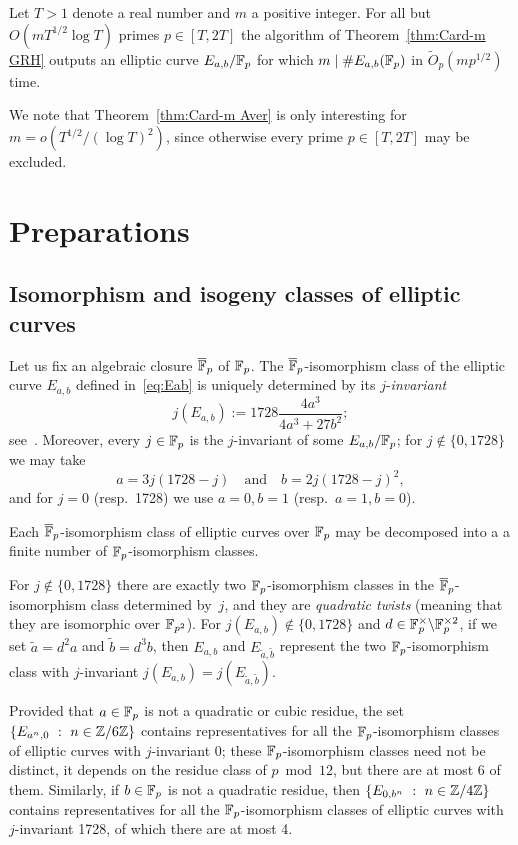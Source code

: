 \documentclass[12pt]{amsart}
\begin{document}
\begin{theorem}\label{thm:Card-m Aver}
Let $T>1$ denote a real number and $m$ a positive integer.
For all but $O(m T^{1/2}\log T)$ primes $p \in [T,2T]$ the algorithm of Theorem~\ref{thm:Card-m GRH} outputs an elliptic curve $E_{a,b}/\mathbb{F}_p$ for which $m\mid\#E_{a,b}(\mathbb{F}_p)$
in $\widetilde{O}_p(mp^{1/2})$ time.
\end{theorem}

We note that Theorem~\ref{thm:Card-m Aver} is only interesting for $m=o(T^{1/2}/(\log T)^{2})$, since otherwise every prime $p\in[T,2T]$ may be excluded.

\section{Preparations}
\label{sec:prep}

\subsection{Isomorphism and isogeny classes of elliptic curves}
Let us fix an algebraic closure $\overline{\mathbb{F}}_p$ of $\mathbb{F}_p$.
The $\overline{\mathbb{F}}_p$-isomorphism class of the elliptic curve $E_{a,b}$
defined in~\eqref{eq:Eab} is uniquely determined by its $j$-\emph{invariant}
$$
j(E_{a,b}) :=  1728\frac{4a^3}{4a^3+27b^2}; 
$$
see~\cite{Silv}. 
Moreover, every $j\in\mathbb{F}_p$ is the $j$-invariant of some $E_{a,b}/\mathbb{F}_p$;
for $j\not\in \{0,1728\}$ we may take
$$
a=3j(1728-j)\quad\text{and}\quad b=2j(1728-j)^2,
$$
and for $j=0$ (resp.\ 1728) we use $a=0, b=1$ (resp.\ $a=1,b=0$).

Each $\overline{\mathbb{F}}_p$-isomorphism class of elliptic curves over $\mathbb{F}_p$ may be decomposed into a a finite number of $\mathbb{F}_p$-isomorphism classes.

For $j\not\in \{0,1728\}$ there are exactly two $\mathbb{F}_p$-isomorphism classes in the $\overline{\mathbb{F}}_p$-isomorphism class determined by~$j$, and they are {\it quadratic  twists\/} (meaning that they are isomorphic over $\mathbb{F}_{p^2}$).
For $j(E_{a,b})\not\in\{0,1728\}$ and $d\in \mathbb{F}_p^\times\backslash\mathbb{F}_p^{\times 2}$, if we set $\widetilde{a}=d^2a$ and $\widetilde{b}=d^3b$, then $E_{a,b}$ and $E_{\widetilde{a},\widetilde{b}}$ represent the two $\mathbb{F}_p$-isomorphism class with $j$-invariant $j(E_{a,b})=j(E_{\widetilde{a},\widetilde{b}})$.

Provided that $a\in\mathbb{F}_p$ is not a quadratic or cubic residue, the set
$\{E_{a^n,0}~:~n\in\mathbb{Z}/6\mathbb{Z}\}$ contains representatives for all the $\mathbb{F}_p$-isomorphism classes of elliptic curves with $j$-invariant 0; these $\mathbb{F}_p$-isomorphism classes need not be distinct, it depends on the residue class of $p\bmod 12$, but there are at most 6 of them.
Similarly, if $b\in\mathbb{F}_p$ is not a quadratic residue, then $\{E_{0,b^n}~:~n\in\mathbb{Z}/4\mathbb{Z}\}$ contains representatives for all the $\mathbb{F}_p$-isomorphism classes of elliptic curves with $j$-invariant 1728, of which there are at most 4.
\end{document}
